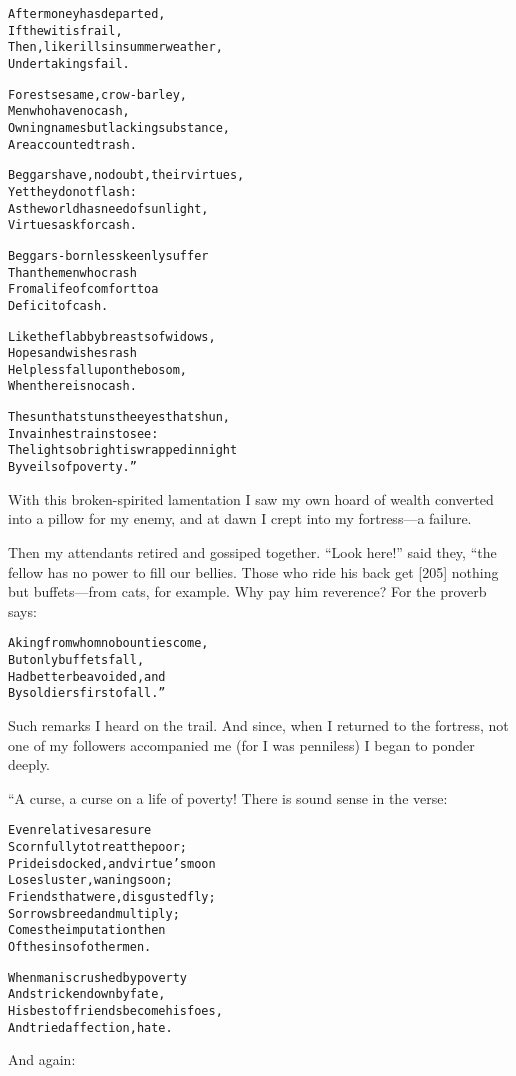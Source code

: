 \documentclass{article}
\renewenvironment{verbatim}{\begin{alltt}\normalfont\begin{centering}}{\end{centering}\end{alltt}}
\begin{document}
\begin{verbatim}
After money has departed,
    If the wit is frail,
Then, like rills in summer weather,
    Undertakings fail.

Forest sesame, crow-barley,
    Men who have no cash,
Owning names but lacking substance,
    Are accounted trash.

Beggars have, no doubt, their virtues,
    Yet they do not flash:
As the world has need of sunlight,
    Virtues ask for cash.

Beggars-born less keenly suffer
    Than the men who crash
From a life of comfort to a
    Deficit of cash.

Like the flabby breasts of widows,
    Hopes and wishes rash
Helpless fall upon the bosom,
    When there is no cash.

The sun that stuns the eyes that shun,
    In vain he strains to see:
The light so bright is wrapped in night
    By veils of poverty.”
\end{verbatim}
With this broken-spirited lamentation I saw my own hoard of wealth
converted into a pillow for my enemy, and at dawn I crept into my
fortress---a failure.

Then my attendants retired and gossiped together. ``Look here!''
said they, “the fellow has no power to fill our bellies. Those who
ride his back get [205] nothing but buffets---from cats, for
example. Why pay him reverence? For the proverb says:

\begin{verbatim}
A king from whom no bounties come,
    But only buffets fall,
Had better be avoided, and
    By soldiers first of all.”
\end{verbatim}
Such remarks I heard on the trail. And since, when I returned to
the fortress, not one of my followers accompanied me (for I was
penniless) I began to ponder deeply.

“A curse, a curse on a life of poverty! There is sound sense in the
verse:

\begin{verbatim}
Even relatives are sure
Scornfully to treat the poor;
Pride is docked, and virtue's moon
Loses luster, waning soon;
Friends that were, disgusted fly;
Sorrows breed and multiply;
Comes the imputation then
Of the sins of other men.

When man is crushed by poverty
    And stricken down by fate,
His best of friends become his foes,
    And tried affection, hate.
\end{verbatim}
And again:
\end{document}
